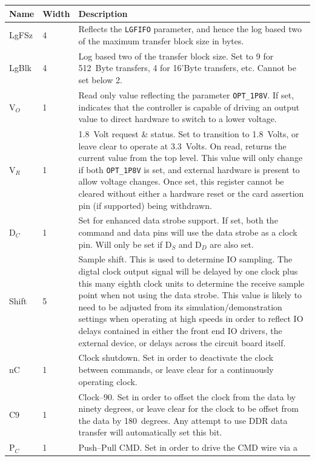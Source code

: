 \documentclass{gqtekspec}
\begin{document}
\begin{table}\begin{center}
\begin{tabular}{|p{1.2in}|p{0.5in}|p{3.5in}|}\hline
	\rowcolor[gray]{0.85} Name & Width & Description\\\hline\hline
LgFSz & 4 & Reflects the {\tt LGFIFO} parameter, and hence the log based two
	of the maximum transfer block size in bytes. \\
LgBlk & 4 & Log based two of the transfer block size.  Set to 9 for 512~Byte
	transfers, 4 for 16'Byte transfers, etc.  Cannot be set below 2.\\
%
V$_O$ & 1 & Read only value reflecting the parameter {\tt OPT\_1P8V}.  If set,
	indicates that the controller is capable of driving an output value
	to direct hardware to switch to a lower voltage.\\
V$_R$ & 1 & 1.8~Volt request \& status.  Set to transition to 1.8~Volts, or
	leave clear to operate at 3.3~Volts.  On read, returns the current
	value from the top level.  This value will only change if both
	{\tt OPT\_1P8V} is set, and external hardware is present to allow
	voltage changes.  Once set, this register cannot be cleared without
	either a hardware reset or the card assertion pin (if supported)
	being withdrawn. \\
D$_C$ & 1 & Set for enhanced data strobe support.  If set, both the command
	and data pins will use the data strobe as a clock pin.  Will only
	be set if D$_S$ and D$_D$ are also set.
	\\
Shift & 5 & Sample shift.  This is used to determine IO sampling.  The digtal
	clock output signal will be delayed by one clock plus this many
	eighth clock units to determine the receive sample point when not
	using the data strobe.  This value is likely to need to be adjusted
	from its simulation/demonstration settings when operating at high speeds
	in order to reflect IO delays contained in either the front end IO
	drivers, the external device, or delays across the circuit board
	itself. \\
%
nC & 1 & Clock shutdown.  Set in order to deactivate the clock between commands,
	or leave clear for a continuously operating clock.\\
C9 & 1 & Clock--90.  Set in order to offset the clock from the data by
	ninety degrees, or leave clear for the clock to be offset from the
	data by 180~degrees.  Any attempt to use DDR data transfer will
	automatically set this bit.\\
P$_C$ & 1 & Push--Pull CMD.  Set in order to drive the CMD wire via a

\end{tabular}
\end{center}
\end{table}
\end{document}
